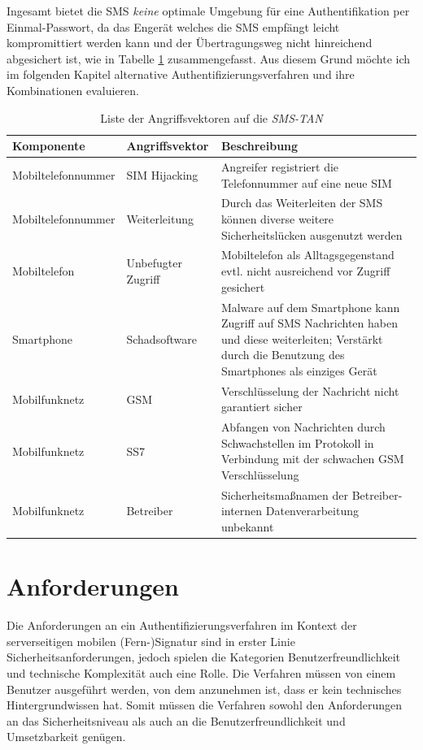 \documentclass[11pt,a4paper,ngerman]{scrreprt}
\begin{document}
Ingesamt bietet die SMS \emph{keine} optimale Umgebung für eine Authentifikation per Einmal-Passwort, da das Engerät welches die SMS empfängt leicht kompromittiert werden kann und der Übertragungsweg nicht hinreichend abgesichert ist, wie in Tabelle \ref{table:AngriffsvektorenSMSTAN} zusammengefasst. Aus diesem Grund möchte ich im folgenden Kapitel alternative Authentifizierungsverfahren und ihre Kombinationen evaluieren.
\begin{table}[htbp]
    \begin{tabularx}{\textwidth}{ llX }
        \toprule
        Komponente & Angriffsvektor & Beschreibung  \\
        \midrule
        Mobiltelefonnummer & SIM Hijacking & Angreifer registriert die Telefonnummer auf eine neue SIM \\
        Mobiltelefonnummer & Weiterleitung & Durch das Weiterleiten der SMS können diverse weitere Sicherheitslücken ausgenutzt werden \\
        Mobiltelefon & Unbefugter Zugriff & Mobiltelefon als Alltagsgegenstand evtl. nicht ausreichend vor Zugriff gesichert \\
        Smartphone & Schadsoftware & Malware auf dem Smartphone kann Zugriff auf SMS Nachrichten haben und diese weiterleiten; Verstärkt durch die Benutzung des Smartphones als einziges Gerät \\
        Mobilfunknetz & GSM & Verschlüsselung der Nachricht nicht garantiert sicher \\
        Mobilfunknetz & SS7 & Abfangen von Nachrichten durch Schwachstellen im Protokoll in Verbindung mit der schwachen GSM Verschlüsselung \\
        Mobilfunknetz & Betreiber & Sicherheitsmaßnamen der Betreiber-internen Datenverarbeitung unbekannt \\
        \bottomrule
    \end{tabularx}
    \caption{Liste der Angriffsvektoren auf die \textit{SMS-TAN}}
    \label{table:AngriffsvektorenSMSTAN}
\end{table}
\clearpage

\section{Anforderungen}\label{sec:Anforderungen}
Die Anforderungen an ein Authentifizierungsverfahren im Kontext der serverseitigen mobilen (Fern-)Signatur sind in erster Linie Sicherheitsanforderungen, jedoch spielen die Kategorien Benutzerfreundlichkeit und technische Komplexität auch eine Rolle. Die Verfahren müssen von einem Benutzer ausgeführt werden, von dem anzunehmen ist, dass er kein technisches Hintergrundwissen hat. Somit müssen die Verfahren sowohl den Anforderungen an das Sicherheitsniveau als auch an die Benutzerfreundlichkeit und Umsetzbarkeit genügen. 
\end{document}
